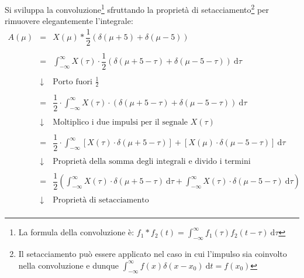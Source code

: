 \documentclass[a4paper]{article}
\begin{document}
	\noindent
	Si sviluppa la convoluzione\footnote{La formula della convoluzione è: $f_{1} * f_{2}\left(t\right) = \displaystyle\int_{-\infty}^{\infty} f_{1}\left(\tau\right) f_{2}\left(t-\tau\right) \: \mathrm{d}\tau$} sfruttando la proprietà di setacciamento\footnote{Il setacciamento può essere applicato nel caso in cui l'impulso sia coinvolto nella convoluzione e dunque $\displaystyle\int_{-\infty}^{\infty}f\left(x\right) \delta\left(x-x_{0}\right)\: \mathrm{d}t = f\left(x_{0}\right)$} per rimuovere elegantemente l'integrale:
	\begin{equation*}
		\begin{array}{lll}
			A\left(\mu\right) & = & X\left(\mu\right) * \dfrac{1}{2}\left(\delta\left(\mu+5\right) + \delta\left(\mu-5\right)\right) \\
			\\
			& = & \displaystyle\int_{-\infty}^{\infty} X\left(\tau\right) \cdot \dfrac{1}{2}\left(\delta\left(\mu+5-\tau\right) + \delta\left(\mu-5-\tau\right)\right) \: \mathrm{d}\tau \\
			\\
			& \downarrow & \text{Porto fuori } \frac{1}{2} \\
			\\
			& = & \dfrac{1}{2} \cdot \displaystyle\int_{-\infty}^{\infty} X\left(\tau\right) \cdot \left(\delta\left(\mu+5-\tau\right) + \delta\left(\mu-5-\tau\right)\right) \: \mathrm{d}\tau \\
			\\
			& \downarrow & \text{Moltiplico i due impulsi per il segnale } X\left(\tau\right) \\
			\\
			& = & \dfrac{1}{2} \cdot \displaystyle\int_{-\infty}^{\infty} \left[X\left(\tau\right) \cdot \delta\left(\mu+5-\tau\right)\right] + \left[X\left(\mu\right) \cdot \delta\left(\mu-5-\tau\right)\right] \: \mathrm{d}\tau \\
			\\
			& \downarrow & \text{Proprietà della somma degli integrali e divido i termini} \\
			\\
			& = & \dfrac{1}{2} \left( \displaystyle\int_{-\infty}^{\infty}X\left(\tau\right) \cdot \delta\left(\mu+5-\tau\right) \: \mathrm{d}\tau + \displaystyle\int_{-\infty}^{\infty}X\left(\tau\right) \cdot \delta\left(\mu-5-\tau\right) \: \mathrm{d}\tau \right) \\
			\\
			& \downarrow & \text{Proprietà di setacciamento} \\

\end{array}
\end{equation*}
\end{document}

